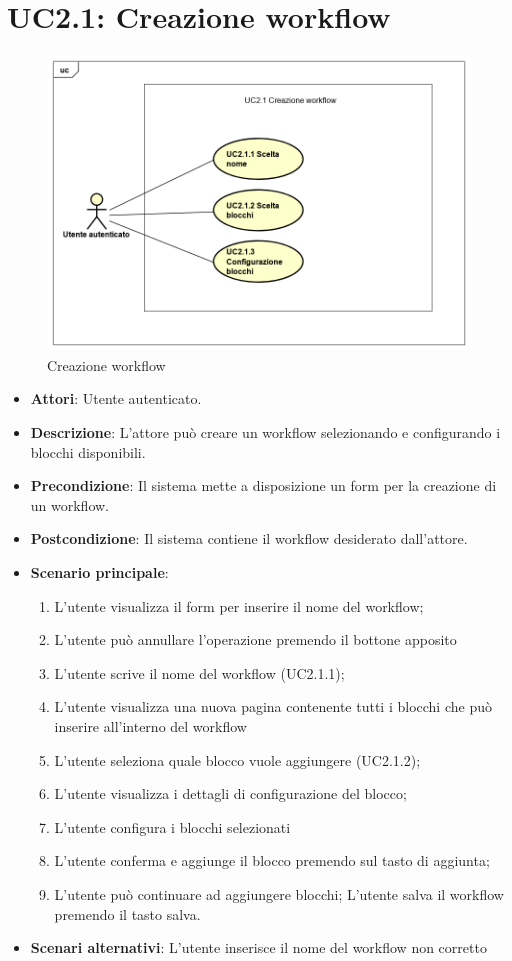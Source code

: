 \newpage
\section{UC2.1: Creazione workflow}
\label{UC2.1}

\begin{figure} [h]
	\centering
	\includegraphics[scale=0.4]{./Diagram/UC2-1.png}
	\caption{Creazione workflow}\label{}
\end{figure}

\begin{itemize}
	\item \textbf{Attori}: Utente autenticato.
	\item \textbf{Descrizione}: L'attore può creare un workflow selezionando e configurando i blocchi disponibili.
	\item \textbf{Precondizione}: Il sistema mette a disposizione un form per la creazione di un workflow.
	\item \textbf{Postcondizione}: Il sistema contiene il workflow desiderato dall'attore.
	\item \textbf{Scenario principale}:
	\begin{enumerate} \item L'utente visualizza il form per inserire il nome del workflow; \item L'utente può annullare l'operazione premendo il bottone apposito \item L'utente scrive il nome del workflow (UC2.1.1);  \item L'utente visualizza una nuova pagina contenente tutti i blocchi che può inserire all'interno del workflow \item L'utente seleziona quale blocco vuole aggiungere (UC2.1.2); \item L'utente visualizza i dettagli di configurazione del blocco;  \item L'utente configura i blocchi selezionati \item L'utente conferma e aggiunge il blocco premendo sul tasto di aggiunta; \item L'utente può continuare ad aggiungere blocchi; L'utente salva il workflow premendo il tasto salva.\end{enumerate}
	\item \textbf{Scenari alternativi}:
	L'utente inserisce il nome del workflow non corretto
\end{itemize}


